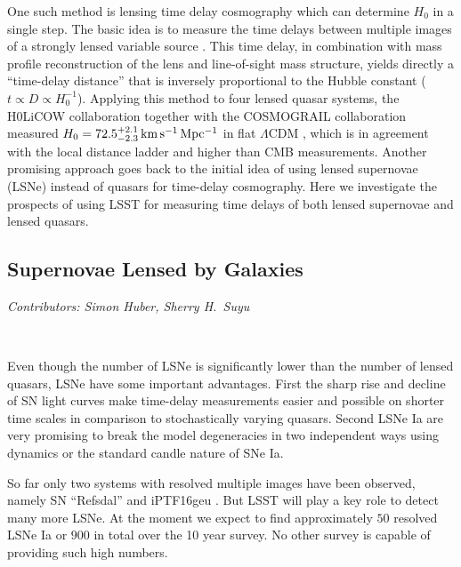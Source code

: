 One such method is lensing time delay cosmography which can determine
$H_0$ in a single step. The basic idea is to measure the time delays
between multiple images of a strongly lensed variable source
\citep{Refsdal:1964}. This time delay, in combination with mass
profile reconstruction of the lens and line-of-sight mass structure,
yields directly a ``time-delay distance'' that is inversely
proportional to the Hubble constant ($t \propto D \propto
H_0^{-1}$). Applying this method to four lensed quasar systems, the
H0LiCOW collaboration \citep{Suyu:2016qxx} together with the
COSMOGRAIL collaboration
\citep[e.g.]{Eigenbrod:2005ie,2013Tewes,2017Courbin} measured $H_0 =
72.5^{+2.1}_{-2.3} \,{\rm km\,s^{-1}\,Mpc^{-1}}$ in flat
$\Lambda$CDM \citep{Birrer:2018vtm}, which is in agreement with the
local distance ladder and higher than CMB measurements.  Another
promising approach goes back to the initial idea of
\cite{Refsdal:1964} using lensed supernovae (LSNe) instead of quasars
for time-delay cosmography. Here we investigate the prospects of using
LSST for measuring time delays of both lensed supernovae and lensed
quasars.

\subsection{Supernovae Lensed by Galaxies}
\textit{Contributors: Simon Huber, Sherry H.~Suyu}

\

Even though the number of LSNe is significantly lower than the number of
lensed quasars, LSNe have some important advantages. First 
the sharp rise
and decline of SN light curves make time-delay measurements easier and possible
on shorter time scales in comparison to stochastically varying quasars. Second LSNe Ia are very promising
to break the model degeneracies \citep{Schneider:2013wga} in two
independent ways using dynamics \citep{Barnabe2011,2017:Yildirim} or
the standard candle nature of SNe Ia.  

So far only two systems with resolved
multiple images have been observed, namely SN ``Refsdal''
\citep{Kelly:2015xvu,Kelly:2015vjq} and iPTF16geu
\citep{Goobar:2016uuf}. But LSST will play a key role to detect many
more LSNe. At the moment we expect to find approximately $50$ resolved
LSNe Ia \citep{Oguri:2010} or $900$ in total \citep{Goldstein:2017bny}
over the 10 year survey. No other survey is capable of providing such
high numbers.

